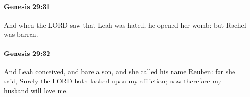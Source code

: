 		\paragraph{Genesis 29:31} %
			\label{GENESIS-29-31}

			And when the LORD saw that Leah was hated, he opened her womb: but Rachel was barren.


		\paragraph{Genesis 29:32} %
			\label{GENESIS-29-32}

			And Leah conceived, and bare a son, and she called his name Reuben: for she said, Surely the LORD hath looked upon my affliction; now therefore my husband will love me.



